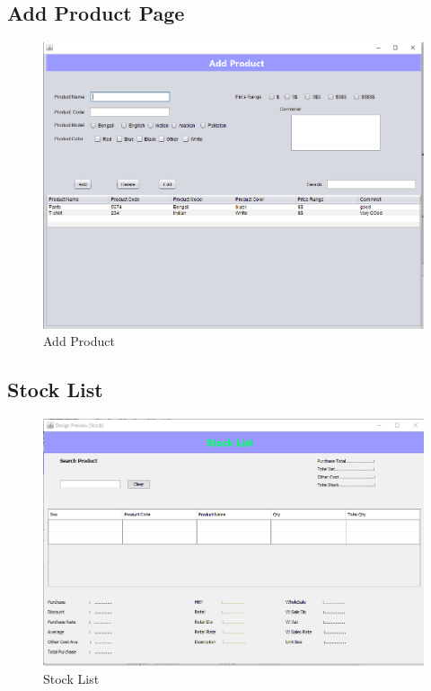 \documentclass{article}
\begin{document}
\subsection{Add Product Page}
\begin{figure}[h]
    \centering
    \includegraphics[width=13 cm]{ui/addproduct.png}
    \caption{Add Product}
    \label{fig:my_label}
\end{figure}
\newpage
\subsection{Stock List}
\begin{figure}[h]
    \centering
    \includegraphics[width=15 cm]{ui/stocklist.png}
    \caption{Stock List}
    \label{fig:my_label}
\end{figure}
\newpage
\end{document}
